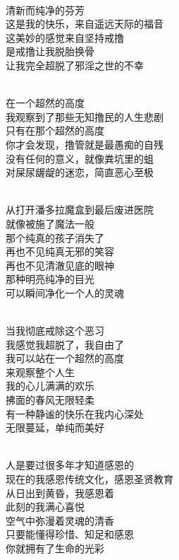 \begin{poem}[戒行者]
    \begin{multicols}{2}
        \begin{center}~\\
            清新而纯净的芬芳 \\ 这是我的快乐，来自遥远天际的福音 \\ 这美妙的感觉来自坚持戒撸 \\ 是戒撸让我脱胎换骨 \\ 让我完全超脱了邪淫之世的不幸

            ~\\

            在一个超然的高度 \\ 我观察到了那些无知撸民的人生悲剧 \\ 只有在那个超然的高度 \\ 你才会发现，撸管就是最愚痴的自残 \\ 没有任何的意义，就像粪坑里的蛆 \\ 对屎尿龌龊的迷恋，简直恶心至极

            ~\\

            从打开潘多拉魔盒到最后废进医院 \\ 就像被施了魔法一般 \\ 那个纯真的孩子消失了 \\ 再也不见纯真无邪的笑容 \\ 再也不见清澈见底的眼神 \\ 那种明亮纯净的目光 \\ 可以瞬间净化一个人的灵魂

            ~\\

            当我彻底戒除这个恶习 \\ 我感觉我超脱了，我自由了 \\ 我可以站在一个超然的高度 \\ 来观察整个人生 \\ 我的心儿满满的欢乐 \\ 拂面的春风无限轻柔 \\ 有一种静谧的快乐在我内心深处 \\ 无限蔓延，单纯而美好

            ~\\

            人是要过很多年才知道感恩的 \\ 现在的我感恩传统文化，感恩圣贤教育 \\ 从日出到黄昏，我感恩着 \\ 此刻的我满心喜悦 \\ 空气中弥漫着灵魂的清香 \\ 只要能懂得珍惜、知足和感恩 \\ 你就拥有了生命的光彩


\end{center}
\end{multicols}
\end{poem}
